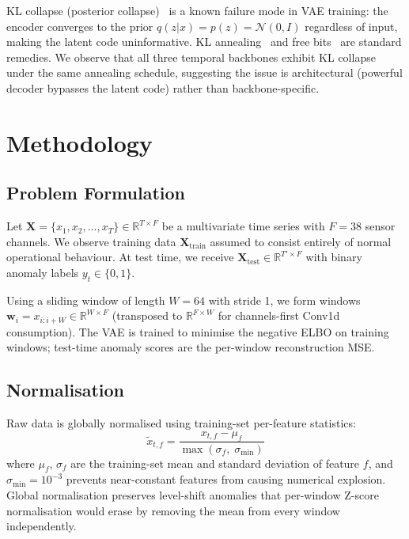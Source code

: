 \documentclass[10pt,twocolumn]{article}
\begin{document}
KL collapse (posterior collapse)~\cite{bowman2016generating} is a known failure
mode in VAE training: the encoder converges to the prior $q(z|x) = p(z) =
\mathcal{N}(0, I)$ regardless of input, making the latent code uninformative.
KL annealing~\cite{fu2019cyclical} and free bits~\cite{kingma2016improved} are
standard remedies. We observe that all three temporal backbones exhibit KL
collapse under the same annealing schedule, suggesting the issue is architectural
(powerful decoder bypasses the latent code) rather than backbone-specific.


\section{Methodology}

\subsection{Problem Formulation}

Let $\mathbf{X} = \{x_1, x_2, \ldots, x_T\} \in \mathbb{R}^{T \times F}$ be a
multivariate time series with $F = 38$ sensor channels. We observe training data
$\mathbf{X}_{\text{train}}$ assumed to consist entirely of normal operational
behaviour. At test time, we receive $\mathbf{X}_{\text{test}} \in
\mathbb{R}^{T' \times F}$ with binary anomaly labels $y_t \in \{0, 1\}$.

Using a sliding window of length $W = 64$ with stride 1, we form windows
$\mathbf{w}_i = x_{i:i+W} \in \mathbb{R}^{W \times F}$ (transposed to
$\mathbb{R}^{F \times W}$ for channels-first Conv1d consumption). The VAE is
trained to minimise the negative ELBO on training windows; test-time anomaly
scores are the per-window reconstruction MSE.

\subsection{Normalisation}

Raw data is globally normalised using training-set per-feature statistics:
\begin{equation}
  \tilde{x}_{t,f} = \frac{x_{t,f} - \mu_f}{\max(\sigma_f,\; \sigma_{\min})}
\end{equation}
where $\mu_f$, $\sigma_f$ are the training-set mean and standard deviation of
feature $f$, and $\sigma_{\min} = 10^{-3}$ prevents near-constant features from
causing numerical explosion. Global normalisation preserves level-shift anomalies
that per-window Z-score normalisation would erase by removing the mean from every
window independently.
\end{document}
